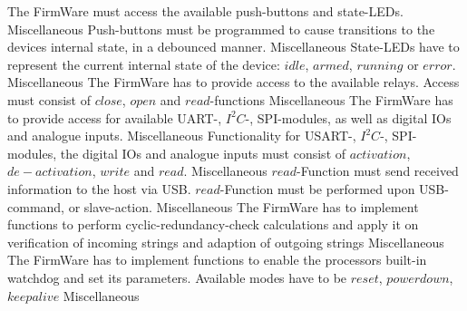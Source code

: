 	{ The FirmWare must access the available push-buttons and state-LEDs. }
	{}{}{}{Miscellaneous}
	{ Push-buttons must be programmed to cause transitions to the devices internal state, in a debounced manner. }
	{}{}{}{Miscellaneous}
	{ State-LEDs have to represent the current internal state of the device: $idle$, $armed$, $running$ or $error$. }
	{}{}{}{Miscellaneous}
	{ The FirmWare has to provide access to the available relays. Access must consist of $close$, $open$ and $read$-functions }
	{}{}{}{Miscellaneous}
	{ The FirmWare has to provide access for available UART-, $I^2C$-, SPI-modules, as well as digital IOs and analogue inputs.}
	{}{}{}{Miscellaneous}
	{ Functionality for USART-, $I^2C$-, SPI-modules, the digital IOs and analogue inputs must consist of $activation$, $de-activation$, $write$ and $read$.}
	{}{}{}{Miscellaneous}
	{ $read$-Function must send received information to the host via USB.
	  $read$-Function must be performed upon USB-command, or slave-action.}
	{}{}{}{Miscellaneous}
	{ The FirmWare has to implement functions to perform cyclic-redundancy-check calculations and apply it on verification of incoming strings and adaption of outgoing strings}
	{}{}{}	{Miscellaneous}
	{  The FirmWare has to implement functions to enable the processors built-in watchdog and set its parameters. Available modes have to be $reset$, $powerdown$, $keepalive$}
	{}{}{}	{Miscellaneous}


